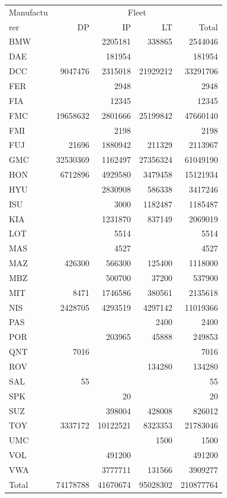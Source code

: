 \begin{tabular}{lrrrr}
\toprule
Manufactu & \multicolumn{4}{c}{Fleet} \\
rer & DP & IP & LT & Total \\
\midrule
BMW &  & 2205181 & 338865 & 2544046 \\
DAE &  & 181954 &  & 181954 \\
DCC & 9047476 & 2315018 & 21929212 & 33291706 \\
FER &  & 2948 &  & 2948 \\
FIA &  & 12345 &  & 12345 \\
FMC & 19658632 & 2801666 & 25199842 & 47660140 \\
FMI &  & 2198 &  & 2198 \\
FUJ & 21696 & 1880942 & 211329 & 2113967 \\
GMC & 32530369 & 1162497 & 27356324 & 61049190 \\
HON & 6712896 & 4929580 & 3479458 & 15121934 \\
HYU &  & 2830908 & 586338 & 3417246 \\
ISU &  & 3000 & 1182487 & 1185487 \\
KIA &  & 1231870 & 837149 & 2069019 \\
LOT &  & 5514 &  & 5514 \\
MAS &  & 4527 &  & 4527 \\
MAZ & 426300 & 566300 & 125400 & 1118000 \\
MBZ &  & 500700 & 37200 & 537900 \\
MIT & 8471 & 1746586 & 380561 & 2135618 \\
NIS & 2428705 & 4293519 & 4297142 & 11019366 \\
PAS &  &  & 2400 & 2400 \\
POR &  & 203965 & 45888 & 249853 \\
QNT & 7016 &  &  & 7016 \\
ROV &  &  & 134280 & 134280 \\
SAL & 55 &  &  & 55 \\
SPK &  & 20 &  & 20 \\
SUZ &  & 398004 & 428008 & 826012 \\
TOY & 3337172 & 10122521 & 8323353 & 21783046 \\
UMC &  &  & 1500 & 1500 \\
VOL &  & 491200 &  & 491200 \\
VWA &  & 3777711 & 131566 & 3909277 \\
Total & 74178788 & 41670674 & 95028302 & 210877764 \\
\bottomrule
\end{tabular}

